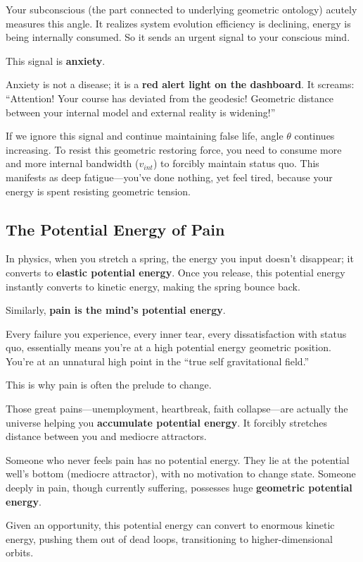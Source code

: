 Your subconscious (the part connected to underlying geometric ontology) acutely measures this angle. It realizes system evolution efficiency is declining, energy is being internally consumed. So it sends an urgent signal to your conscious mind.

This signal is \textbf{anxiety}.

Anxiety is not a disease; it is a \textbf{red alert light on the dashboard}. It screams: ``Attention! Your course has deviated from the geodesic! Geometric distance between your internal model and external reality is widening!''

If we ignore this signal and continue maintaining false life, angle $\theta$ continues increasing. To resist this geometric restoring force, you need to consume more and more internal bandwidth ($v_{int}$) to forcibly maintain status quo. This manifests as deep fatigue---you've done nothing, yet feel tired, because your energy is spent resisting geometric tension.

\subsection{The Potential Energy of Pain}

In physics, when you stretch a spring, the energy you input doesn't disappear; it converts to \textbf{elastic potential energy}. Once you release, this potential energy instantly converts to kinetic energy, making the spring bounce back.

Similarly, \textbf{pain is the mind's potential energy}.

Every failure you experience, every inner tear, every dissatisfaction with status quo, essentially means you're at a high potential energy geometric position. You're at an unnatural high point in the ``true self gravitational field.''

This is why pain is often the prelude to change.

Those great pains---unemployment, heartbreak, faith collapse---are actually the universe helping you \textbf{accumulate potential energy}. It forcibly stretches distance between you and mediocre attractors.

Someone who never feels pain has no potential energy. They lie at the potential well's bottom (mediocre attractor), with no motivation to change state. Someone deeply in pain, though currently suffering, possesses huge \textbf{geometric potential energy}.

Given an opportunity, this potential energy can convert to enormous kinetic energy, pushing them out of dead loops, transitioning to higher-dimensional orbits.

